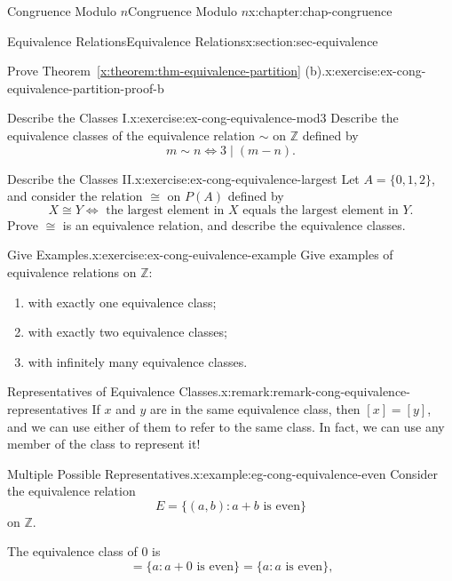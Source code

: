 \documentclass[oneside,10pt,]{book}
\newcommand{\xreffont}{\relax}
\numberwithin{equation}{section}
\begin{document}
\begin{chapterptx}{Congruence Modulo \(n\)}{}{Congruence Modulo \(n\)}{}{}{x:chapter:chap-congruence}
\begin{sectionptx}{Equivalence Relations}{}{Equivalence Relations}{}{}{x:section:sec-equivalence}
\begin{inlineexercise}{Prove Theorem~{\xreffont\ref*{x:theorem:thm-equivalence-partition}} (b).}{x:exercise:ex-cong-equivalence-partition-proof-b}
\end{inlineexercise}
\begin{inlineexercise}{Describe the Classes I.}{x:exercise:ex-cong-equivalence-mod3}%
Describe the equivalence classes of the equivalence relation \(\sim\) on \(\mathbb{Z}\) defined by%
\begin{equation*}
m \sim n \Leftrightarrow 3 \mid (m - n)\text{.}
\end{equation*}
%
\end{inlineexercise}
\begin{inlineexercise}{Describe the Classes II.}{x:exercise:ex-cong-equivalence-largest}%
Let \(A = \{0,1,2\}\), and consider the relation \(\cong\) on \(P(A)\) defined by%
\begin{equation*}
X \cong Y \Leftrightarrow \text{ the largest element in } X \text{ equals the largest element in } Y\text{.}
\end{equation*}
Prove \(\cong\) is an equivalence relation, and describe the equivalence classes.%
\end{inlineexercise}
\begin{inlineexercise}{Give Examples.}{x:exercise:ex-cong-euivalence-example}%
Give examples of equivalence relations on \(\mathbb{Z}\):%
\begin{enumerate}[label=(\alph*)]
\item{}with exactly one equivalence class;%
\item{}with exactly two equivalence classes;%
\item{}with infinitely many equivalence classes.%
\end{enumerate}
%
\end{inlineexercise}
\begin{remark}{Representatives of Equivalence Classes.}{x:remark:remark-cong-equivalence-representatives}%
If \(x\) and \(y\) are in the same equivalence class, then \([x] = [y]\), and we can use either of them to refer to the same class. In fact, we can use any member of the class to represent it!%
\end{remark}
\begin{example}{Multiple Possible Representatives.}{x:example:eg-cong-equivalence-even}%
Consider the equivalence relation%
\begin{equation*}
E = \{(a,b) : a + b \text{ is even}\}
\end{equation*}
on \(\mathbb{Z}\).%
\par
The equivalence class of \(0\) is%
\begin{equation*}
[0] = \{a : a + 0 \text{ is even}\} = \{a : a \text{ is even}\}\text{,}

\end{equation*}
\end{example}
\end{sectionptx}
\end{chapterptx}
\end{document}
